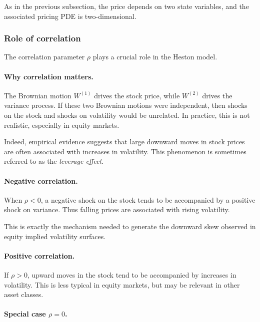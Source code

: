 \documentclass[11pt]{article}
\theoremstyle{plain}
\theoremstyle{definition}
\theoremstyle{remark}
\begin{document}
As in the previous subsection, the price depends on two state variables,
and the associated pricing PDE is two-dimensional.

\subsubsection{Role of correlation}

The correlation parameter \(\rho\) plays a crucial role in the Heston
model.

\paragraph{Why correlation matters.}

The Brownian motion \(W^{(1)}\) drives the stock price, while
\(W^{(2)}\) drives the variance process.
If these two Brownian motions were independent, then shocks on the stock
and shocks on volatility would be unrelated.
In practice, this is not realistic, especially in equity markets.

Indeed, empirical evidence suggests that large downward moves in stock
prices are often associated with increases in volatility.
This phenomenon is sometimes referred to as the \emph{leverage effect}.

\paragraph{Negative correlation.}

When \(\rho<0\), a negative shock on the stock tends to be accompanied by
a positive shock on variance.
Thus falling prices are associated with rising volatility.

This is exactly the mechanism needed to generate the downward skew
observed in equity implied volatility surfaces.

\paragraph{Positive correlation.}

If \(\rho>0\), upward moves in the stock tend to be accompanied by
increases in volatility.
This is less typical in equity markets, but may be relevant in other
asset classes.

\paragraph{Special case \(\rho=0\).}
\end{document}
